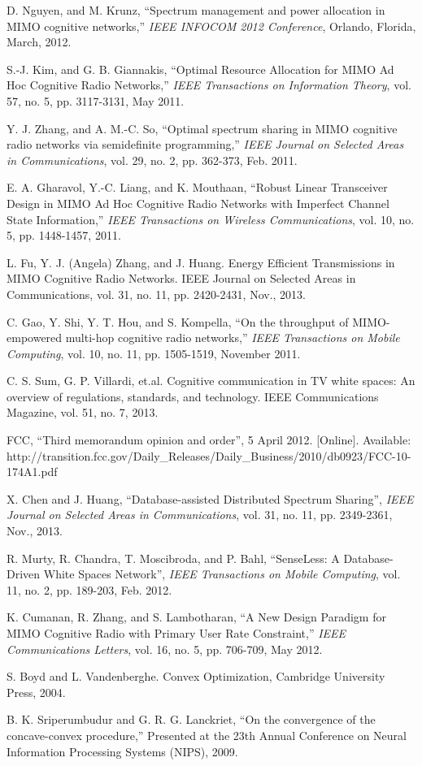 \documentclass[12pt,onecolumn,tworows]{IEEEtran}
\begin{document}
\begin{thebibliography}{1}
D. Nguyen, and M. Krunz, ``Spectrum management and power allocation in MIMO cognitive networks,'' {\em IEEE INFOCOM 2012 Conference}, Orlando, Florida, March, 2012.

S.-J. Kim, and G. B. Giannakis, ``Optimal Resource Allocation for MIMO Ad Hoc Cognitive Radio Networks,'' {\em IEEE Transactions on Information Theory}, vol. 57, no. 5, pp. 3117-3131, May 2011.

Y. J. Zhang, and A. M.-C. So, ``Optimal spectrum sharing in MIMO cognitive radio networks via semidefinite programming,'' {\em IEEE Journal on Selected Areas in Communications}, vol. 29, no. 2, pp. 362-373, Feb. 2011.

E. A. Gharavol, Y.-C. Liang, and K. Mouthaan, ``Robust Linear Transceiver Design in MIMO Ad Hoc Cognitive Radio Networks with Imperfect Channel State Information,'' {\em IEEE Transactions on Wireless Communications}, vol. 10, no. 5, pp. 1448-1457, 2011.

L. Fu, Y. J. (Angela) Zhang, and J. Huang. Energy Efficient Transmissions in MIMO Cognitive Radio Networks. IEEE Journal on Selected Areas in Communications, vol. 31, no. 11, pp. 2420-2431, Nov., 2013.

C. Gao, Y. Shi, Y. T. Hou, and S. Kompella, ``On the throughput of MIMO-empowered multi-hop cognitive radio networks,'' {\em IEEE Transactions on Mobile Computing}, vol. 10, no. 11, pp. 1505-1519, November 2011.


C. S. Sum, G. P. Villardi, et.al. Cognitive communication in TV white spaces: An overview of regulations, standards, and technology. IEEE Communications Magazine, vol. 51, no. 7, 2013.

FCC, ``Third memorandum opinion and order'', 5 April 2012.
[Online]. Available: http://transition.fcc.gov/Daily\_Releases/Daily\_Business/2010/db0923/FCC-10-174A1.pdf

X. Chen and J. Huang, ``Database-assisted Distributed Spectrum Sharing'', \emph{IEEE Journal on Selected Areas in Communications}, vol. 31, no. 11, pp. 2349-2361, Nov., 2013.

R. Murty, R. Chandra, T. Moscibroda, and P. Bahl, ``SenseLess: A Database-Driven White Spaces Network'', \emph{IEEE Transactions on Mobile Computing}, vol. 11, no. 2, pp. 189-203, Feb. 2012.

K. Cumanan, R. Zhang, and S. Lambotharan, ``A New Design Paradigm for MIMO Cognitive Radio with Primary User Rate Constraint,'' {\em IEEE Communications Letters}, vol. 16, no. 5, pp. 706-709, May 2012.

S. Boyd and L. Vandenberghe. Convex Optimization, Cambridge University Press, 2004.

B. K. Sriperumbudur and G. R. G. Lanckriet, ``On the convergence of the concave-convex procedure,'' Presented at the 23th Annual Conference on Neural Information Processing Systems (NIPS), 2009.
\end{thebibliography}
\end{document}
